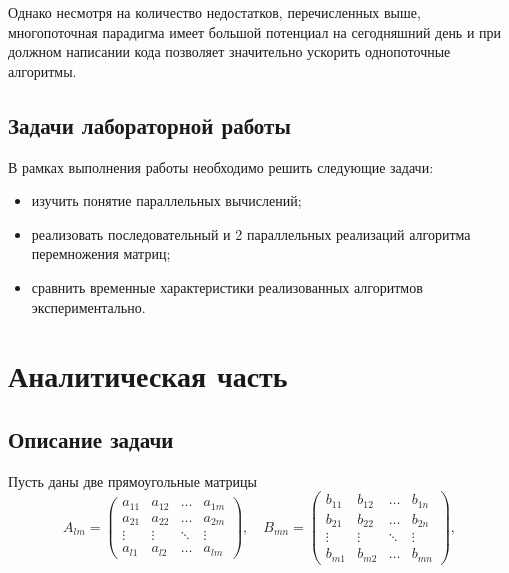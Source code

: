 \documentclass[12pt]{report}
\begin{document}
Однако несмотря на количество недостатков, перечисленных выше, многопоточная парадигма имеет большой потенциал на сегодняшний день и при должном написании кода позволяет значительно ускорить однопоточные алгоритмы.


\section*{Задачи лабораторной работы}

В рамках выполнения работы необходимо решить следующие задачи:

\begin{itemize}

	\item изучить понятие параллельных вычислений;

	\item реализовать последовательный и 2 параллельных реализаций алгоритма перемножения матриц;

	\item сравнить временные характеристики реализованных алгоритмов экспериментально.
\end{itemize}

\chapter{Аналитическая часть}

\section{Описание задачи}


Пусть даны две прямоугольные матрицы
\begin{equation}
A_{lm} = \begin{pmatrix}
a_{11} & a_{12} & \ldots & a_{1m}\\
a_{21} & a_{22} & \ldots & a_{2m}\\
\vdots & \vdots & \ddots & \vdots\\
a_{l1} & a_{l2} & \ldots & a_{lm}
\end{pmatrix},
\quad
B_{mn} = \begin{pmatrix}
b_{11} & b_{12} & \ldots & b_{1n}\\
b_{21} & b_{22} & \ldots & b_{2n}\\
\vdots & \vdots & \ddots & \vdots\\
b_{m1} & b_{m2} & \ldots & b_{mn}
\end{pmatrix},
\end{equation}
\end{document}
